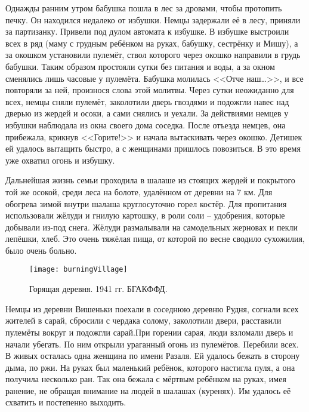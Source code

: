 Однажды ранним утром бабушка пошла в лес за дровами, чтобы протопить печку. Он находился недалеко от избушки. Немцы задержали её в лесу, приняли за партизанку. Привели под дулом автомата к избушке. В избушке выстроили всех в ряд (маму с грудным ребёнком на руках, бабушку, сестрёнку и Мишу), а за окошком установили пулемёт, ствол которого через окошко направили в грудь бабушки. Таким образом простояли сутки без питания и воды, а за окном сменялись лишь часовые у пулемёта. Бабушка молилась <<Отче наш\dots>>, и все повторяли за ней, произнося слова этой молитвы. Через сутки неожиданно для всех, немцы сняли пулемёт, заколотили дверь гвоздями и подожгли навес над дверью из жердей и осоки, а сами снялись и уехали. За действиями немцев у избушки наблюдала из окна своего дома соседка. После отъезда немцев, она прибежала, крикнув <<Горите!>> и начала вытаскивать через окошко. Детишек ей удалось вытащить быстро, а с женщинами пришлось повозиться. В это время уже охватил огонь и избушку.

Дальнейшая жизнь семьи проходила в шалаше из стоящих жердей и покрытого той же осокой, среди леса на болоте, удалённом от деревни на 7 км. Для обогрева зимой внутри шалаша круглосуточно горел костёр. Для пропитания использовали жёлуди и гнилую картошку, в роли соли \--- удобрения, которые добывали из-под снега. Жёлуди размалывали на самодельных жерновах и пекли лепёшки, хлеб. Это очень тяжёлая пища, от которой по весне сводило сухожилия, было очень больно. 

\begin{wrapfigure}{O}{.4\textwidth}
\centering
\texttt{[image: burningVillage]}
\caption[Горящая деревня. 1941 гг. БГАКФФД.]{Горящая деревня. 1941 гг. БГАКФФД\footnotemark.}
\label{fig:burningVillage}
\end{wrapfigure}

Немцы из деревни Вишеньки поехали в соседнюю деревню Рудня, согнали всех жителей в сарай, сбросили с чердака солому, заколотили двери, расставили пулемёты вокруг и подожгли сарай.При горении сарая, люди взломали дверь и начали убегать. По ним открыли ураганный огонь из пулемётов. Перебили всех. В живых осталась одна женщина по имени Разаля. Ей удалось бежать в сторону дыма, по ржи. На руках был маленький ребёнок, которого настигла пуля, а она получила несколько ран. Так она бежала с мёртвым ребёнком на руках, имея ранение, не обращая внимание на людей в шалашах (куренях). Им удалось её схватить и постепенно выходить. 

